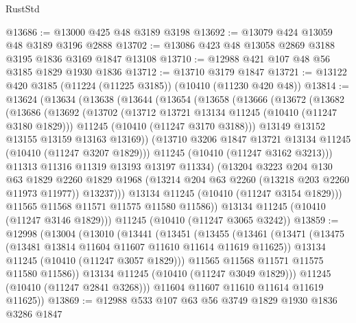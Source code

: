 \begin{lexlean}{RustStd}
\begin{coremodule}
@13686 := @13000 @425 @48 @3189 @3198
@13692 := @13079 @424 @13059 @48 @3189 @3196 @2888
@13702 := @13086 @423 @48 @13058 @2869 @3188 @3195 @1836 @3169 @1847 @13108
@13710 := @12988 @421 @107 @48 @56 @3185 @1829 @1930 @1836
@13712 := @13710 @3179 @1847
@13721 := @13122 @420 @3185 (@11224 (@11225 @3185)) (@10410 (@11230 @420 @48))
@13814 := @13624
    (@13634
      (@13638
        (@13644
          (@13654
            (@13658
              (@13666
                (@13672
                  (@13682
                    (@13686
                      (@13692
                        (@13702
                          (@13712 @13721 @13134 @11245 (@10410 (@11247 @3180 @1829)))
                          @11245
                          (@10410 (@11247 @3170 @3188)))
                        @13149
                        @13152
                        @13155
                        @13159
                        @13163
                        @13169))
                    (@13710 @3206 @1847 @13721 @13134 @11245 (@10410 (@11247 @3207 @1829)))
                    @11245
                    (@10410 (@11247 @3162 @3213)))
                  @11313
                  @11316
                  @11319
                  @13193
                  @13197
                  @11334)
                (@13204
                  @3223
                  @204
                  @130
                  @63
                  @1829
                  @2260
                  @1829
                  @1968
                  (@13214 @204 @63 @2260 (@13218 @203 @2260 @11973 @11977))
                  @13237)))
            @13134
            @11245
            (@10410 (@11247 @3154 @1829)))
          @11565
          @11568
          @11571
          @11575
          @11580
          @11586))
      @13134
      @11245
      (@10410 (@11247 @3146 @1829)))
    @11245
    (@10410 (@11247 @3065 @3242))
@13859 := @12998
    (@13004
      (@13010
        (@13441
          (@13451
            (@13455
              (@13461
                (@13471
                  (@13475 (@13481 @13814 @11604 @11607 @11610 @11614 @11619 @11625))
                  @13134
                  @11245
                  (@10410 (@11247 @3057 @1829)))
                @11565
                @11568
                @11571
                @11575
                @11580
                @11586))
            @13134
            @11245
            (@10410 (@11247 @3049 @1829)))
          @11245
          (@10410 (@11247 @2841 @3268)))
        @11604
        @11607
        @11610
        @11614
        @11619
        @11625))
@13869 := @12988 @533 @107 @63 @56 @3749 @1829 @1930 @1836 @3286 @1847

\end{coremodule}
\end{lexlean}

